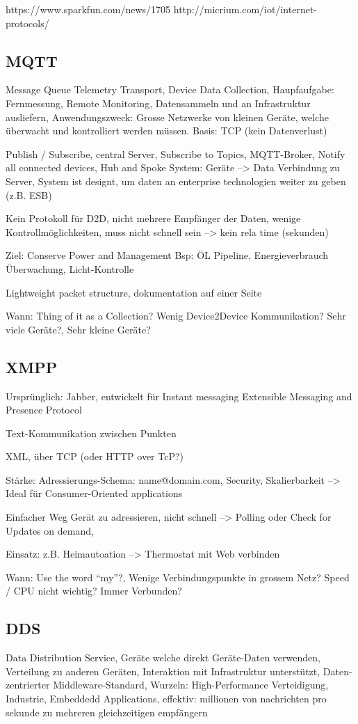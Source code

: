 https://www.sparkfun.com/news/1705
http://micrium.com/iot/internet-protocols/

\subsection{MQTT}
Message Queue Telemetry Transport, Device Data Collection, Haupfaufgabe: Fernmessung, Remote Monitoring, Datensammeln und an Infrastruktur ausliefern, Anwendungszweck: Grosse Netzwerke von kleinen Geräte, welche überwacht und kontrolliert werden müssen. Basis: TCP (kein Datenverlust)

Publish / Subscribe, central Server, Subscribe to Topics, MQTT-Broker, Notify all connected devices, 
Hub and Spoke System: Geräte --> Data Verbindung zu Server, System ist designt, um daten an enterprise technologien weiter zu geben (z.B. ESB)

Kein Protokoll für D2D, nicht mehrere Empfänger der Daten, wenige Kontrollmöglichkeiten, muss nicht schnell sein --> kein rela time (sekunden)

Ziel: Conserve Power and Management
Bsp: ÖL Pipeline, Energieverbrauch Überwachung, Licht-Kontrolle

Lightweight packet structure, dokumentation auf einer Seite


Wann: Thing of it as a Collection?  Wenig Device2Device Kommunikation? Sehr viele Geräte?, Sehr kleine Geräte? 

\subsection{XMPP}
Ursprünglich: Jabber, entwickelt für Instant messaging
Extensible Messaging and Presence Protocol

Text-Kommunikation zwischen Punkten

XML, über TCP (oder HTTP over TcP?)

Stärke: Adressierungs-Schema: name@domain.com, Security, Skalierbarkeit 
--> Ideal für Consumer-Oriented applications

Einfacher Weg Gerät zu adressieren, nicht schnell --> Polling oder Check for Updates on demand, 

Einsatz: z.B. Heimautoation --> Thermostat mit Web verbinden

Wann: Use the word "`my"'?, Wenige Verbindungspunkte in grossem Netz? Speed / CPU nicht wichtig? Immer Verbunden?

\subsection{DDS}
Data Distribution Service, Geräte welche direkt Geräte-Daten verwenden, Verteilung zu anderen Geräten, Interaktion mit Infrastruktur unterstützt, Daten-zentrierter Middleware-Standard, Wurzeln: High-Performance Verteidigung, Industrie, Embeddedd Applications, effektiv: millionen von nachrichten pro sekunde zu mehreren gleichzeitigen empfängern


